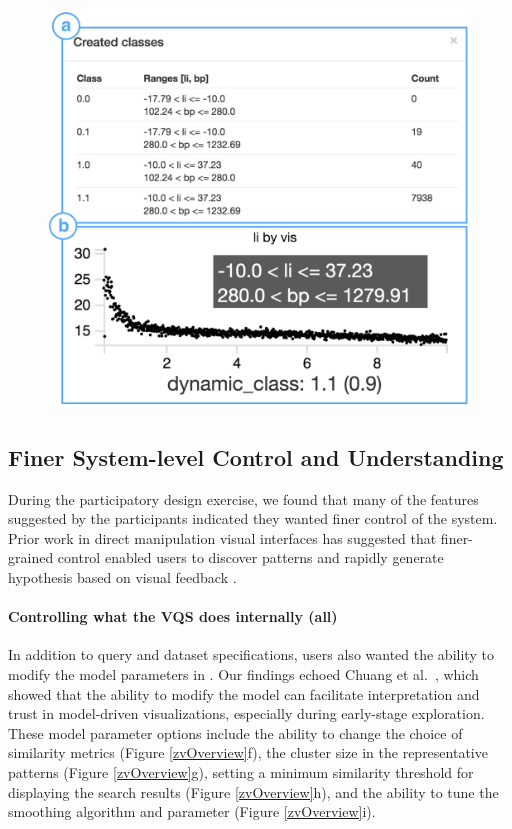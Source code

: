 \begin{figure}[ht!]
\centering
\includegraphics[width=0.7\linewidth]{figures/dcc_example.png}
\vspace{-6pt}
\caption{}
\label{dcc}
\end{figure}
\subsection{Finer System-level Control and  Understanding}
\par During the participatory design exercise, we found that many of the features suggested by the participants indicated they wanted finer control of the system. Prior work in direct manipulation visual interfaces has suggested that finer-grained control enabled users to discover patterns and rapidly generate hypothesis based on visual feedback \cite{Shneiderman1994,Shneiderman2007a}. 
\paragraph{Controlling what the VQS does internally (all)}
In addition to query and dataset specifications, users also wanted the ability to modify the model parameters in \zv. Our findings echoed Chuang et al.~\cite{Chuang2012}, which showed that the ability to modify the model can facilitate interpretation and trust in model-driven visualizations, especially during early-stage exploration. These model parameter options include the ability to change the choice of similarity metrics (Figure \ref{zvOverview}f), the cluster size in the representative patterns (Figure \ref{zvOverview}g), setting a minimum similarity threshold for displaying the search results (Figure \ref{zvOverview}h), and the ability to tune the smoothing algorithm and parameter (Figure \ref{zvOverview}i).
